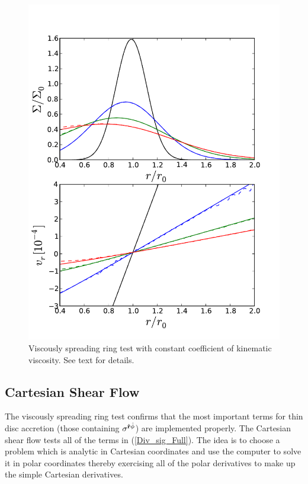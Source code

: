 \begin{figure}
\begin{center}
\includegraphics[scale=0.5]{figures/ch1/ViscRing_tau032_Jan2013.pdf} 
\end{center}
\caption{Viscously spreading ring test with constant coefficient of kinematic viscosity. See text for details.}
\label{ViscRing}
\end{figure}

\subsection{Cartesian Shear Flow}
The viscously spreading ring test confirms that the most important terms for thin disc accretion (those containing $\sigma^{\hat {\bf r} {\hat{\phi}}}$) are implemented properly. The Cartesian shear flow tests all of the terms in (\ref{Div_sig_Full}). The idea is to choose a problem which is analytic in Cartesian coordinates and use the computer to solve it in polar coordinates thereby exercising all of the polar derivatives to make up the simple Cartesian derivatives. 

